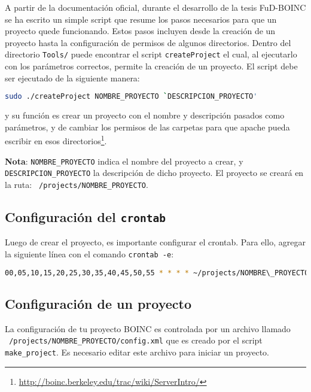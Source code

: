 \documentclass[12pt,spanish,a4paper]{report}
\begin{document}
A partir de la documentación oficial, durante el desarrollo de la tesis FuD-BOINC se ha escrito un simple script que resume los pasos necesarios para que un proyecto quede funcionando. Estos pasos incluyen desde la creación de un proyecto hasta la configuración de permisos de algunos directorios. Dentro del directorio \texttt{Tools/} puede encontrar el script \texttt{createProject} el cual, al ejecutarlo con los parámetros correctos, permite la creación de un proyecto. El script debe ser ejecutado de la siguiente manera:

\begin{lstlisting}[frame=shadowbox, language=bash, basicstyle=\footnotesize, backgroundcolor=\color{gris}]
sudo ./createProject NOMBRE_PROYECTO `DESCRIPCION_PROYECTO'
\end{lstlisting}

y su función es crear un proyecto con el nombre y descripción pasados como parámetros, y de cambiar los permisos de las carpetas para que apache pueda escribir en esos directorios\footnote{\url{http://boinc.berkeley.edu/trac/wiki/ServerIntro/}}.

\textbf{Nota}: \texttt{NOMBRE\_PROYECTO} indica el nombre del proyecto a crear, y \texttt{DESCRIPCION\_PROYECTO} la descripción de dicho proyecto. El proyecto se creará en la ruta: \texttt{~/projects/NOMBRE\_PROYECTO}.


\subsection{Configuración del \texttt{crontab}}

Luego de crear el proyecto, es importante configurar el crontab. Para ello, agregar la siguiente línea con el comando \texttt{crontab -e}:
\begin{lstlisting}[frame=shadowbox, language=bash, basicstyle=\footnotesize, backgroundcolor=\color{gris}]
00,05,10,15,20,25,30,35,40,45,50,55 * * * * ~/projects/NOMBRE\_PROYECTO/bin/start --cron  >/dev/null
\end{lstlisting}


\subsection{Configuración de un proyecto}
\label{project:config}

La configuración de tu proyecto BOINC es controlada por un archivo llamado \texttt{~/projects/NOMBRE\_PROYECTO/config.xml} que es creado por el script \texttt{make\_project}. Es necesario editar este archivo para iniciar un proyecto. 
\end{document}
